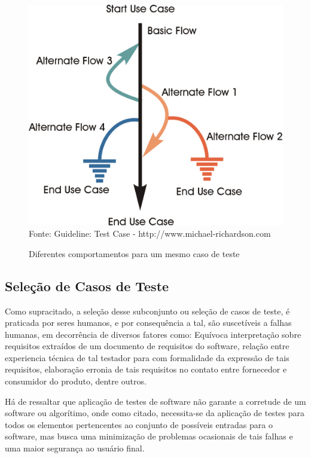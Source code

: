 \begin{figure}[!htb][H]
\centering
\caption{Diferentes comportamentos para um mesmo caso de teste} %
\includegraphics[scale=0.1]{02}\\  %
{\small Fonte: Guideline: Test Case	- http://www.michael-richardson.com} %
\label{fig:exemplo} %
\end{figure}


\subsection{Seleção de Casos de Teste}
Como supracitado, a seleção desse subconjunto ou seleção de casos de teste, é praticada por seres humanos, e por consequência a tal, são suscetíveis a falhas humanas, em decorrência de diversos fatores como: Equívoca interpretação sobre requisitos extraídos de um documento de requisitos do software, relação entre experiencia técnica de tal testador para com formalidade da expressão de tais requisitos, elaboração erronia de tais requisitos no contato entre fornecedor e consumidor do produto, dentre outros.

Há de ressaltar que aplicação de testes de software não garante a corretude de um software ou algorítimo, onde como citado, necessita-se da aplicação de testes para todos os elementos pertencentes ao conjunto de possíveis entradas para o software, mas busca uma minimização de problemas ocasionais de tais falhas e uma maior segurança ao usuário final.

